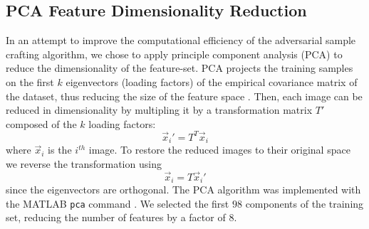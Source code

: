 \subsection{PCA Feature Dimensionality Reduction} \label{sec:pca}
In an attempt to improve the computational efficiency of the adversarial sample crafting algorithm, we chose to apply principle component analysis (PCA) to reduce the dimensionality of the feature-set. PCA projects the training samples on the first $k$ eigenvectors (loading factors) of the empirical covariance matrix of the dataset, thus reducing the size of the feature space \cite{coursenotes}. Then, each image can be reduced in dimensionality by multipling it by a transformation matrix $T'$ composed of the $k$ loading factors:
\begin{equation}
\vec{x}_i' = T^T \vec{x}_i
\end{equation}
where $\vec{x}_i$ is the $i^{th}$ image. To restore the reduced images to their original space we reverse the transformation using
\begin{equation}
\vec{x}_i = T \vec{x}_i' 
\end{equation}
since the eigenvectors are orthogonal. The PCA algorithm was implemented with the MATLAB \texttt{pca} command \cite{matlab}. We selected the first $98$ components of the training set, reducing the number of features by a factor of $8$. 